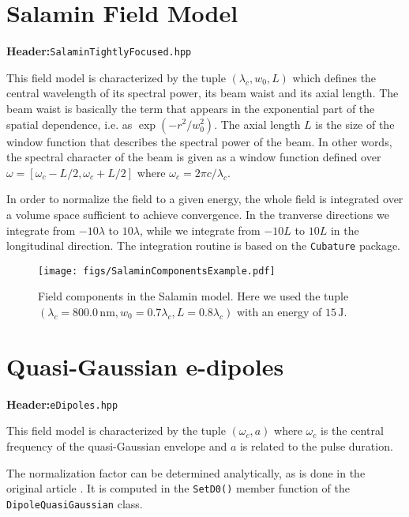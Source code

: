 \documentclass[10pt,letterpaper,extrafontsizes, onecolumn,openright]{memoir}
\begin{document}
\section{Salamin Field Model}
\textbf{Header:}\hfill\texttt{SalaminTightlyFocused.hpp}
\vspace{0.5cm}

This field model is characterized by the tuple $(\lambda_c,w_0,L)$ which
defines the central wavelength of its spectral power, its beam waist and
its axial length. The beam waist is basically the term that appears in the exponential
part of the spatial dependence, i.e. as $\exp(-r^2/w_0^2)$. The axial length $L$
is the size of the window function that describes the spectral power of the beam.
In other words, the spectral character of the beam is given as a window function
defined over $\omega=[\omega_c-L/2,­\omega_c+L/2]$ where $\omega_c=2\pi c/\lambda_c$.

In order to normalize the field to a given energy, the whole field is integrated
over a volume space sufficient to achieve convergence. In the tranverse
directions we integrate from $-10\lambda$ to $10\lambda$, while we integrate
from $-10L$ to $10L$ in the longitudinal direction. The integration routine
is based on the \texttt{Cubature} package.

\begin{figure}
	\centering
	\texttt{[image: figs/SalaminComponentsExample.pdf]}
	\caption{Field components in the Salamin model. Here we used the tuple
	$(\lambda_c=800.0\,\si{\nano\metre},w_0=0.7\lambda_c, L=0.8\lambda_c)$
	with an energy of $15\,\si{\joule}$.}
\end{figure}

\section{Quasi-Gaussian e-dipoles}
\textbf{Header:}\hfill\texttt{eDipoles.hpp}
\vspace{0.5cm}

This field model is characterized by the tuple $(\omega_c,a)$ where $\omega_c$
is the central frequency of the quasi-Gaussian envelope and $a$ is related
to the pulse duration.

The normalization factor can be determined analytically, as is done
in the original article \cite{GON2012}. It is computed in the \texttt{SetD0()}
member function of the \texttt{DipoleQuasiGaussian} class.

\appendix



\end{document}
